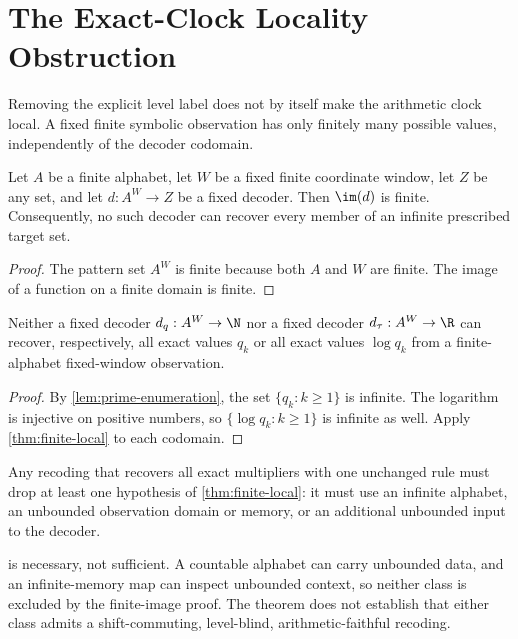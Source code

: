 \section{The Exact-Clock Locality Obstruction}
\label{sec:clock}

Removing the explicit level label does not by itself make the arithmetic
clock local.  A fixed finite symbolic observation has only finitely many
possible values, independently of the decoder codomain.

\begin{theorem}
\label{thm:finite-local}
Let $A$ be a finite alphabet, let $W$ be a fixed finite coordinate window,
let $Z$ be any set, and let $d:A^W\to Z$ be a fixed decoder.  Then
$\im(d)$ is finite.  Consequently, no such decoder can recover every member
of an infinite prescribed target set.
\end{theorem}

\begin{proof}
The pattern set $A^W$ is finite because both $A$ and $W$ are finite.  The
image of a function on a finite domain is finite.
\end{proof}

\begin{corollary}
\label{cor:finite-local-wheel}
Neither a fixed decoder $d_q:A^W\to\N$ nor a fixed decoder
$d_\tau:A^W\to\R$ can recover, respectively, all exact values $q_k$ or all
exact values $\log q_k$ from a finite-alphabet fixed-window observation.
\end{corollary}

\begin{proof}
By \cref{lem:prime-enumeration}, the set $\{q_k:k\geq1\}$ is infinite.  The
logarithm is injective on positive numbers, so
$\{\log q_k:k\geq1\}$ is infinite as well.  Apply
\cref{thm:finite-local} to each codomain.
\end{proof}

\begin{corollary}
\label{cor:local-escape}
Any recoding that recovers all exact multipliers with one unchanged rule must
drop at least one hypothesis of \cref{thm:finite-local}: it must use an
infinite alphabet, an unbounded observation domain or memory, or an additional
unbounded input to the decoder.
\end{corollary}

 is necessary, not sufficient.  A countable alphabet
can carry unbounded data, and an infinite-memory map can inspect unbounded
context, so neither class is excluded by the finite-image proof.  The theorem
does not establish that either class admits a shift-commuting, level-blind,
arithmetic-faithful recoding.

